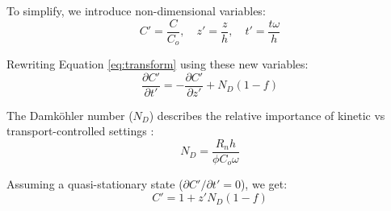 \begin{tcolorbox}
{\begin{multicols}{2}

To simplify, we introduce non-dimensional variables:
\vspace{10mm}
\columnbreak %
\begin{equation}
    C' = \frac{C}{C_o},\quad z' = \frac{z}{h},\quad t' = \frac{t\omega}{h}
    \label{eq:transform}
\end{equation}
    
\end{multicols}

\bsk

\begin{multicols}{2}%
    
    Rewriting Equation \ref{eq:transform} using these new variables:
    \vspace{10mm}
    \columnbreak %
    \begin{equation}
        \frac{\partial C'}{\partial t'} = -\frac{\partial C'}{\partial z'} + N_D(1-f)
    \end{equation}
    
\end{multicols}

\bsk

\begin{multicols}{2} %
    
    The Damköhler number (\(N_D\)) describes the relative importance of kinetic vs transport-controlled settings \parencite{bethkeGEOCHEMICALBIOGEOCHEMICALREACTION}:
    \vspace{10mm}
    \columnbreak
    \begin{equation}
        N_D = \frac{R_n h}{\phi C_o \omega}
    \end{equation}
    
\end{multicols}

\bsk

\begin{multicols}{2} %
    
    Assuming a quasi-stationary state (\(\partial C'/\partial t' = 0\)), we get:
    \vspace{10mm}
    \columnbreak %
    \begin{equation}
        C' = 1 + z'N_D(1-f)
    \end{equation}
    

\end{multicols}}
\end{tcolorbox}
